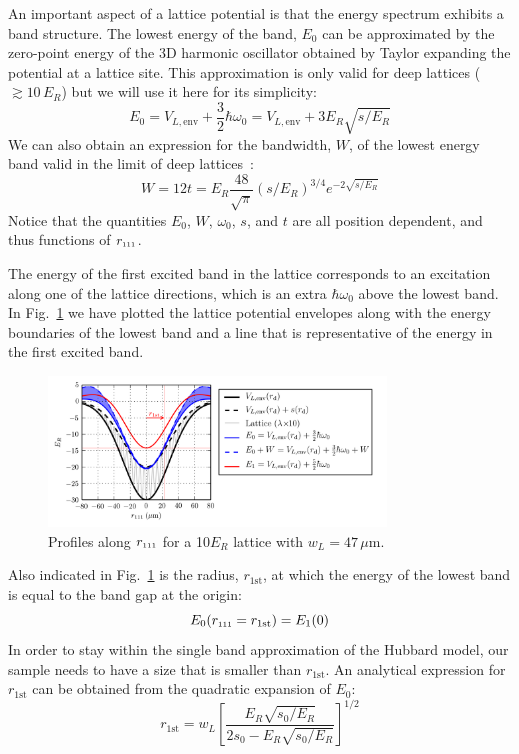 \documentclass[11pt,letter]{article}
\newcommand{\rdiag}{\ensuremath{ r_{\text{\tiny{111}}} } }
\begin{document}
An important aspect of a lattice potential is that the energy spectrum exhibits
a band structure.  The lowest energy of the band, $E_{0}$ can be approximated
by the zero-point energy of the 3D harmonic oscillator obtained by Taylor
expanding the potential at a lattice site.   This approximation is only valid
for deep lattices ($\gtrsim 10\,E_{R}$) but we will use it here for its
simplicity: 
\begin{equation}
  E_{0} =  V_{L,\text{env}} +  
     \frac{3}{2} \hbar \omega_{0}  = V_{L,\text{env}} +  3E_{R}\sqrt{ s/E_{R} } 
\end{equation} 
We can also obtain an expression for the bandwidth, $W$, of the lowest energy
band valid in the limit of deep lattices~\cite{Bloch2008}:
\begin{equation}
  W =   12 t 
  = E_{R}\frac{48}{\sqrt{\pi}} (s/E_{R})^{3/4} e^{-2\sqrt{s/E_{R}}} 
\end{equation}
Notice that the quantities $E_{0}$, $W$, $\omega_{0}$, $s$, and $t$ are all
position dependent, and thus functions of $\rdiag$. 

The energy of the first excited band in the lattice corresponds to an
excitation along one of the lattice directions, which is an extra $\hbar
\omega_{0}$  above the lowest band.  In Fig.~\ref{fig:lattice_general} we have
plotted the lattice potential envelopes along with the energy boundaries of the
lowest band and a line that is representative of the energy in the  first
excited band.  
\begin{figure}
    \centering
    \includegraphics[width=0.8\textwidth]{figures/lattice_general.png}
    \caption{Profiles along $\rdiag$ for a 10$E_{R}$ lattice with $w_{L}=47\,\mu$m. }
\label{fig:lattice_general}
\end{figure}
Also indicated in Fig.~\ref{fig:lattice_general} is the radius,
$r_{1\text{st}}$, at which the energy of the lowest band is equal to the band
gap at the origin:
\begin{equation}
  E_{0}(\rdiag=r_{1\text{st}} )  = 
  E_{1}(0 )  
\end{equation} 
 In order to stay within the single band approximation of the Hubbard model,
our sample needs to have a size that is smaller than $r_{1\text{st}}$.   An
analytical expression for $r_{1\text{st}}$ can be obtained from the quadratic
expansion of $E_{0}$: 
\begin{equation}
 r_{1\text{st}} = w_{L} \left[ \frac{E_{R}\sqrt{s_{0}/E_{R}}}
                              {2s_{0}-E_{R}\sqrt{s_{0}/E_{R}}}  \right]^{1/2} 
\label{eq:r1st} 
\end{equation} 
\end{document}
